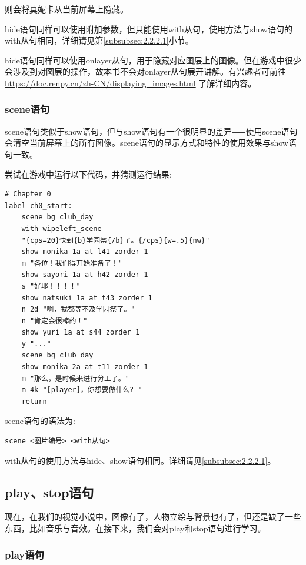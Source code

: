 \documentclass[../../Main.tex]{subfiles}
\begin{document}
则会将莫妮卡从当前屏幕上隐藏。

hide语句同样可以使用附加参数，但只能使用with从句，使用方法与show语句的with从句相同，详细请见第\ref{subsubsec:2.2.2.1}小节。

\begin{ExtraKnowledge}
    hide语句同样可以使用onlayer从句，用于隐藏对应图层上的图像。但在游戏中很少会涉及到对图层的操作，故本书不会对onlayer从句展开讲解。有兴趣者可前往 \url{https://doc.renpy.cn/zh-CN/displaying_images.html} 了解详细内容。
\end{ExtraKnowledge}

\subsubsection{scene语句}
\label{subsubsec:2.2.2.3}

scene语句类似于show语句，但与show语句有一个很明显的差异⸺使用scene语句会清空当前屏幕上的所有图像。scene语句的显示方式和特性的使用效果与show语句一致。

尝试在游戏中运行以下代码，并猜测运行结果:
\begin{lstlisting}[caption=script-ch1.rpy]
# Chapter 0
label ch0_start:
    scene bg club_day
    with wipeleft_scene
    "{cps=20}快到{b}学园祭{/b}了。{/cps}{w=.5}{nw}"
    show monika 1a at l41 zorder 1
    m "各位！我们得开始准备了！"
    show sayori 1a at h42 zorder 1
    s "好耶！！！！"
    show natsuki 1a at t43 zorder 1
    n 2d "啊，我都等不及学园祭了。"
    n "肯定会很棒的！"
    show yuri 1a at s44 zorder 1
    y "..."
    scene bg club_day
    show monika 2a at t11 zorder 1
    m "那么，是时候来进行分工了。"
    m 4k "[player]，你想要做什么? "
    return
\end{lstlisting}

scene语句的语法为:

\begin{lstlisting}[numbers=none]
scene <图片编号> <with从句>
\end{lstlisting}

with从句的使用方法与hide、show语句相同。详细请见\ref{subsubsec:2.2.2.1}。

\subsection{play、stop语句}
现在，在我们的视觉小说中，图像有了，人物立绘与背景也有了，但还是缺了一些东西，比如音乐与音效。在接下来，我们会对play和stop语句进行学习。

\subsubsection{play语句}
\end{document}
